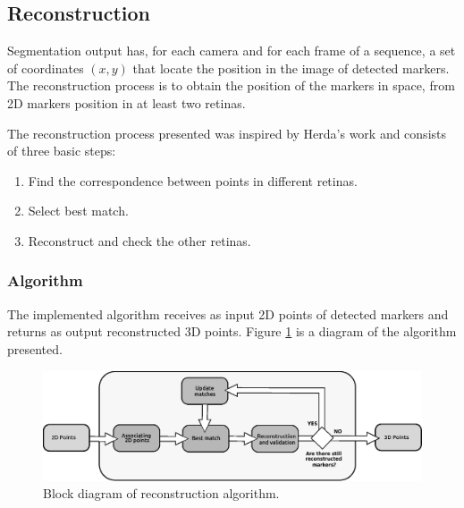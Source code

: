 \subsection{Reconstruction}
Segmentation output has, for each camera and for each frame of a sequence, a set of coordinates $(x, y)$ that locate the position in the image of detected markers.
The reconstruction process is to obtain the position of the markers in space, from 2D markers position in at least two retinas.

The reconstruction process presented was inspired by Herda's work and consists of three basic steps:
\vspace{-0.2cm}
\begin{enumerate}
\item Find the correspondence between points in different retinas.
\item Select best match.
\item Reconstruct and check the other retinas.
\end{enumerate}
\vspace{-0.8cm}
\subsubsection{Algorithm}
The implemented algorithm receives as input 2D points of detected markers and returns as output reconstructed 3D points.
Figure \ref{fig: diagrama algoritmo} is a diagram of the algorithm presented.
\begin{figure}
    \begin{center}
        \includegraphics[scale=0.45]{./imagenes/Reconstruccion/bloques_reconstruccion}
        \caption{Block diagram of reconstruction algorithm.}
        \label{fig: diagrama algoritmo}
    \end{center}
\end{figure}

